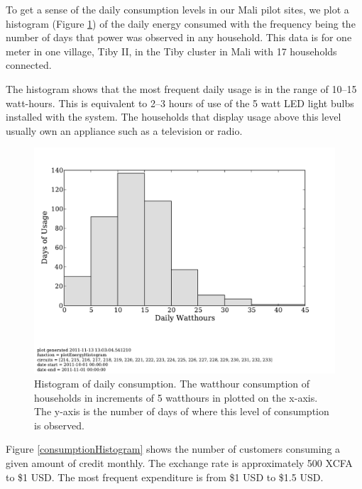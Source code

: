 \documentclass{sig-alternate}
\newcommand{\note}[1]{{\color{red} NOTE: *** #1 ***}}
\begin{document}
To get a sense of the daily consumption levels in our Mali pilot sites,
we plot a histogram (Figure \ref{energyHistogram}) of the daily
energy consumed with the frequency being
the number of days that power was observed in any household.
This data is for one meter in one village, Tiby II, in the Tiby cluster
in Mali with 17 households connected.

The histogram shows that the most frequent
daily usage is in the range of 10--15 watt-hours.
This is equivalent to 2--3 hours of use of the 5 watt LED
light bulbs installed with the system.
The households that display usage above this level usually own an appliance
such as a television or radio.

\begin{figure}[]
\begin{center}
\includegraphics[trim = 0in 1.3in 0in 0in, clip, width=\columnwidth]
                {figures/energyHistogram.pdf}
\end{center}
\caption{Histogram of daily consumption.  The watthour consumption of households
in increments of 5 watthours in plotted on the x-axis.  The y-axis is the number of
days of where this level of consumption is observed.}
\label{energyHistogram}
\end{figure}

Figure \ref{consumptionHistogram} shows the number of customers consuming
a given amount of credit monthly.  
The exchange rate is approximately 500 XCFA to \$1 USD.
The most frequent expenditure is from \$1 USD to \$1.5 USD.
\end{document}
